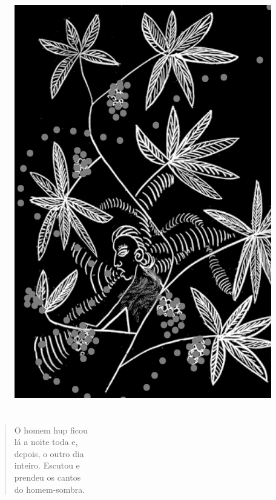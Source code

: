 \begin{figure}
\vspace*{-1.2cm}
\hspace*{-2.2cm}\includegraphics[width=138mm]{./imgs/img3.jpg}
\end{figure}

\chapter*{}

\mbox{}\vspace*{\fill}

\begin{verse}
O homem hup ficou\\
lá a noite toda e,\\
depois, o outro dia\\
inteiro. Escutou e\\
prendeu os cantos\\
do homem-sombra.
\end{verse}

